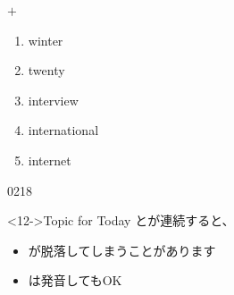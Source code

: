 \documentclass[aspectratio=169,xcolor={dvipsnames,table}]{beamer}
\begin{document}
\begin{frame}[plain]{ $+$ }
 \Large
\begin{enumerate}
 \item<2-> winter  
 \item<4-> twenty  
 \item<6-> interview  
 \item<8-> international  
 \item<10-> internet  
\end{enumerate}
\hfill{\tiny 0218}\,{\scriptsize {}}

\begin{block}<12->{Topic for Today}\small
 とが連続すると、
  \begin{itemize}[square]\small
   \item<13-> が脱落してしまうことがあります
   \item<14-> は発音してもOK
 \end{itemize}
\end{block}


\end{frame}
\end{document}
